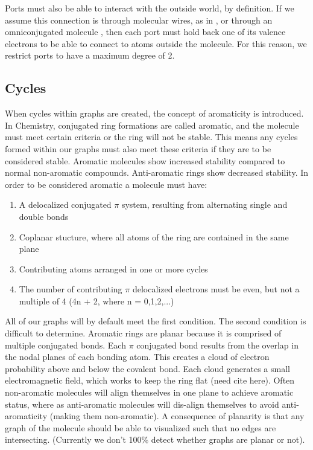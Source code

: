 \documentclass[12pt]{article}
\begin{document}
Ports must also be able to interact with the outside world, by definition. If we assume this connection is through molecular wires, as in \cite{9}, or through an omniconjugated molecule \cite{v06}, then each port must hold back one of its valence electrons to be able to connect to atoms outside the molecule. For this reason, we restrict ports to have a maximum degree of 2. 

\subsection{Cycles}
When cycles within graphs are created, the concept of aromaticity is introduced. In Chemistry, conjugated ring formations are called aromatic, and the molecule must meet certain criteria or the ring will not be stable. This means any cycles formed within our graphs must also meet these criteria if they are to be considered stable. Aromatic molecules show increased stability compared to normal non-aromatic compounds. Anti-aromatic rings show decreased stability. In order to be considered aromatic a molecule must have:

\begin{enumerate}
\item{A delocalized conjugated $\pi$ system, resulting from alternating single and double bonds}
\item{Coplanar stucture, where all atoms of the ring are contained in the same plane}
\item{Contributing atoms arranged in one or more cycles}
\item{The number of contributing $\pi$ delocalized electrons must be even, but not a multiple of 4 (4n + 2, where n = 0,1,2,...)}
\end{enumerate}

All of our graphs will by default meet the first condition. The second condition is difficult to determine. Aromatic rings are planar because it is comprised of multiple conjugated bonds. Each $\pi$ conjugated bond results from the overlap in the nodal planes of each bonding atom. This creates a cloud of electron probability above and below the covalent bond. Each cloud generates a small electromagnetic field, which works to keep the ring flat (need cite here). Often non-aromatic molecules will align themselves in one plane to achieve aromatic status, where as anti-aromatic molecules will dis-align themselves to avoid anti-aromaticity (making them non-aromatic). A consequence of planarity is that any graph of the molecule should be able to visualized such that no edges are intersecting. (Currently we don't 100\% detect whether graphs are planar or not).
\end{document}
